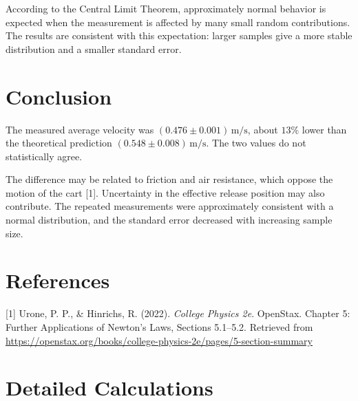 \documentclass[12pt,a4paper]{article}
\begin{document}
According to the Central Limit Theorem, approximately normal behavior is expected when the measurement is affected by many small random contributions. The results are consistent with this expectation: larger samples give a more stable distribution and a smaller standard error.

\section{Conclusion}

The measured average velocity was
\((0.476\pm0.001)\,\mathrm{m/s}\), about \(13\%\) lower than the theoretical prediction
\((0.548\pm0.008)\,\mathrm{m/s}\). The two values do not statistically agree.

The difference may be related to friction and air resistance, which oppose the motion of the cart [1]. Uncertainty in the effective release position may also contribute. The repeated measurements were approximately consistent with a normal distribution, and the standard error decreased with increasing sample size.

\section*{References}

[1] Urone, P. P., \& Hinrichs, R. (2022).
\textit{College Physics 2e}. OpenStax.
Chapter 5: Further Applications of Newton's Laws, Sections 5.1--5.2.
Retrieved from
\url{https://openstax.org/books/college-physics-2e/pages/5-section-summary}

\appendix
\section{Detailed Calculations}
\end{document}
